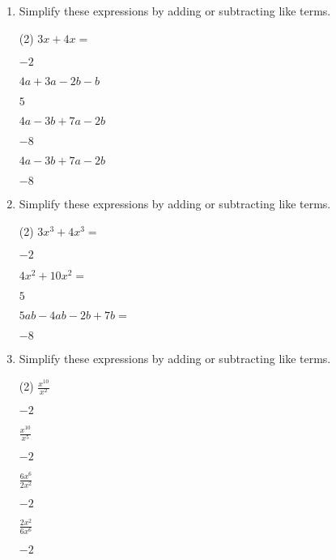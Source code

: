 \begin{enumerate}%

\item Simplify these expressions by adding or subtracting like terms.

\begin{tasks}[label=(\alph*), after-item-skip=2pt,after-skip=3pt, label-width=4ex](2)
    \task  $ 3x+4x=$                           \begin{envFillIn}$  -2     $    \end{envFillIn}
    \task  $ 4a+3a-2b-b$                       \begin{envFillIn}$   5     $    \end{envFillIn}
    \task  $ 4a-3b+7a-2b$                      \begin{envFillIn}$  -8     $    \end{envFillIn}
    \task  $ 4a-3b+7a-2b$                      \begin{envFillIn}$  -8     $    \end{envFillIn}
\end{tasks}

\item Simplify these expressions by adding or subtracting like terms.
\begin{tasks}[label=(\alph*), after-item-skip=2pt,after-skip=3pt, label-width=4ex](2)
    \task  $ 3x^3+4x^3=   $                    \begin{envFillIn}$  -2     $    \end{envFillIn}
    \task  $ 4x^2+10x^2=  $                    \begin{envFillIn}$   5     $    \end{envFillIn}
    \task  $ 5ab-4ab-2b+7b=$                         \begin{envFillIn}$  -8     $    \end{envFillIn}
\end{tasks}

\item Simplify these expressions by adding or subtracting like terms.
\begin{tasks}[label=(\alph*), after-item-skip=2pt,after-skip=3pt, label-width=4ex](2)
    \task  $ \frac{x^10}{x^2}         $                    \begin{envFillIn}$  -2     $    \end{envFillIn}
    \task  $ \frac{x^10}{x^5}         $                    \begin{envFillIn}$  -2     $    \end{envFillIn}
    \task  $ \frac{6x^6}{2x^2}        $                    \begin{envFillIn}$  -2     $    \end{envFillIn}
    \task  $ \frac{2x^2}{6x^6}        $                    \begin{envFillIn}$  -2     $    \end{envFillIn}
\end{tasks}


\end{enumerate}



